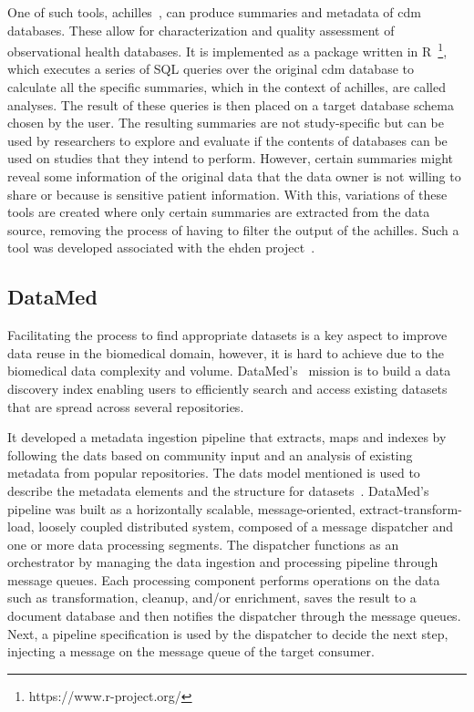 One of such tools, \gls{achilles}~\cite{achilles-github}, can produce summaries and metadata of \gls{cdm} databases.
These allow for characterization and quality assessment of observational health databases.
It is implemented as a package written in R~\footnote{https://www.r-project.org/}, which executes a series of SQL queries over the original \gls{cdm} database to calculate all the specific summaries, which in the context of \gls{achilles}, are called analyses.
The result of these queries is then placed on a target database schema chosen by the user.
The resulting summaries are not study-specific but can be used by researchers to explore and evaluate if the contents of databases can be used on studies that they intend to perform.
However, certain summaries might reveal some information of the original data that the data owner is not willing to share or because is sensitive patient information.
With this, variations of these tools are created where only certain summaries are extracted from the data source, removing the process of having to filter the output of the \gls{achilles}.
Such a tool was developed associated with the \gls{ehden} project~\cite{peters-tool}.

\subsection*{DataMed}
Facilitating the process to find appropriate datasets is a key aspect to improve data reuse in the biomedical domain, however, it is hard to achieve due to the biomedical data complexity and volume.
DataMed's~\cite{datamed} mission is to build a data discovery index enabling users to efficiently search and access existing datasets that are spread across several repositories.

It developed a metadata ingestion pipeline that extracts, maps and indexes by following the \gls{dats} based on community input and an analysis of existing metadata from popular repositories.
The \gls{dats} model mentioned is used to describe the metadata elements and the structure for datasets~\cite{dats}.
DataMed's pipeline was built as a horizontally scalable, message-oriented, extract-transform-load, loosely coupled distributed system, composed of a message dispatcher and one or more data processing segments.
The dispatcher functions as an orchestrator by managing the data ingestion and processing pipeline through message queues.
Each processing component performs operations on the data such as transformation, cleanup, and/or enrichment, saves the result to a document database and then notifies the dispatcher through the message queues.
Next, a pipeline specification is used by the dispatcher to decide the next step, injecting a message on the message queue of the target consumer.

